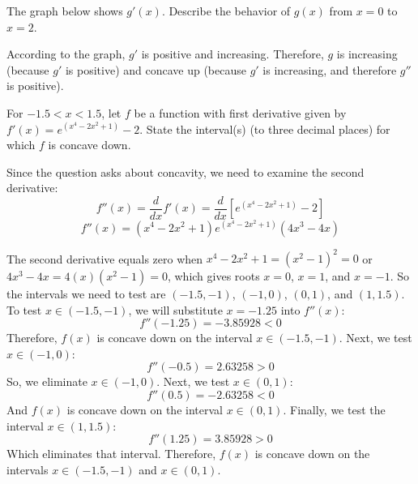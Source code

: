 \begin{Exercise}[label=concavity2]
	The graph below shows $g'(x)$. Describe the behavior of $g(x)$ from $x=0$ 
	to $x=2$. 
\end{Exercise}

\begin{Answer}[ref=concavity2]
	According to the graph, $g'$ is positive and increasing. Therefore, $g$ is 
	increasing (because $g'$ is positive) and concave up (because $g'$ is 
	increasing, and therefore $g''$ is positive).
\end{Answer}

\begin{Exercise} For $-1.5 < x < 1.5$, let $f$ be a 
function with first derivative given by $f'(x) = e^{(x^4 - 2x^2 + 1)} - 2$. State 
the interval(s) (to three decimal places) for which $f$ is concave down. 
\end{Exercise}

\begin{Answer}[ref = concavity3]
Since the question asks about concavity, we need to examine the second derivative:
$$f''(x) = \frac{d}{dx} f'(x) = \frac{d}{dx} \left[ e^{(x^4 - 2x^2 + 1)} - 2 
\right]$$
$$f''(x) = \left( x^4 - 2x^2 + 1 \right) e^{(x^4 - 2x^2 + 1)} \left(4x^3 - 4x 
\right)$$

The second derivative equals zero when $x^4 - 2x^2 + 1 = (x^2 - 1)^2 = 0$ or 
$4x^3 - 4x = 4(x)(x^2-1) = 0$, which gives roots $x = 0$, $x = 1$, and $x = 
-1$. So the intervals we need to test are $(-1.5, -1)$, $(-1, 0)$, $(0, 1)$, 
and $(1, 1.5)$. To test $x \in (-1.5, -1)$, we will substitute $x = -1.25$ 
into $f''(x)$:
$$f''(-1.25) = -3.85928 < 0$$
Therefore, $f(x)$ is concave down on the interval $x \in (-1.5, -1)$. 
Next, we test $x \in (-1, 0)$:
$$f''(-0.5) = 2.63258 > 0$$
So, we eliminate $x \in (-1, 0)$. Next, we test $x \in (0, 1)$:
$$f''(0.5) = -2.63258 < 0$$
And $f(x)$ is concave down on the interval $x \in (0, 1)$. Finally, we test 
the interval $x \in (1, 1.5)$:
$$f''(1.25) = 3.85928 > 0$$
Which eliminates that interval. Therefore, $f(x)$ is concave down on the 
intervals $x \in (-1.5, -1)$ and $x \in (0, 1)$. 
\end{Answer}

